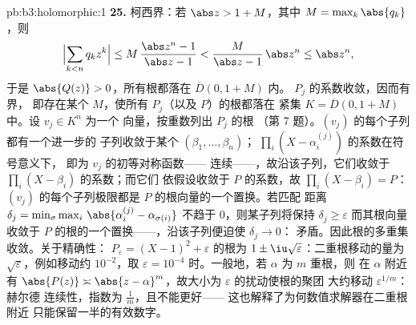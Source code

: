 \begin{solution}{pb:b3:holomorphic:1}
\textbf{25.} 柯西界：若 $\abs z > 1 + M$，其中 $M =
\max_k\abs{q_k}$，则
\[
\Bigl|\sum_{k<n}q_kz^k\Bigr|
\leq M\,\frac{\abs z^n - 1}{\abs z - 1}
< \frac{M}{\abs z - 1}\,\abs z^n \leq \abs z^n,
\]
于是 $\abs{Q(z)} > 0$，所有根都落在 $\overline D(0, 1+M)$ 内。
$P_j$ 的系数收敛，因而有界，
即存在某个 $M$，使所有 $P_j$（以及 $P$）的根都落在
紧集 $K = \overline D(0, 1 + M)$ 中。设 $v_j \in K^n$ 为一个
向量，按重数列出 $P_j$ 的根
（第 7 题）。$(v_j)$ 的每个子列都有一个进一步的
子列收敛于某个 $(\beta_1, \dots, \beta_n)$；
$\prod_i(X - \alpha_i^{(j)})$ 的系数在符号意义下，
即为 $v_j$ 的初等对称函数——
连续——，故沿该子列，它们收敛于
$\prod_i(X - \beta_i)$ 的系数；而它们
依假设收敛于 $P$ 的系数，故 $\prod_i(X -
\beta_i) = P$：$(v_j)$ 的每个子列极限都是
$P$ 的根向量的一个置换。若匹配
距离 $\delta_j = \min_\sigma\max_i\,
\abs{\alpha_i^{(j)} - \alpha_{\sigma(i)}}$ 不趋于
$0$，则某子列将保持 $\delta_j \geq \varepsilon$
而其根向量收敛于
$P$ 的根的一个置换——，沿该子列便迫使 $\delta_j \to 0$：
矛盾。因此根的多重集收敛。关于精确性：
$P_\varepsilon = (X - 1)^2 + \varepsilon$ 的根为 $1 \pm
\iu\sqrt\varepsilon$：二重根移动的量为
$\sqrt\varepsilon$，例如移动约 $10^{-2}$，取 $\varepsilon =
10^{-4}$ 时。一般地，若 $\alpha$ 为 $m$ 重根，则
在 $\alpha$ 附近有 $\abs{P(z)} \asymp \abs{z -
\alpha}^m$，故大小为 $\varepsilon$ 的扰动使根的聚团
大约移动 $\varepsilon^{1/m}$：赫尔德
连续性，指数为 $\frac1m$，且不能更好——
这也解释了为何数值求解器在二重根附近
只能保留一半的有效数字。
\end{solution}
